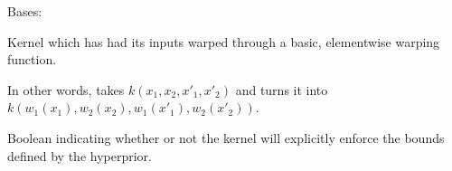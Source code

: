 \documentclass[letterpaper,10pt,english]{sphinxmanual}
\begin{document}
\begin{fulllineitems}
\label{gptools.kernel:gptools.kernel.warping.WarpedKernel}
Bases: {\hyperref[gptools.kernel:gptools.kernel.core.Kernel]{}}

Kernel which has had its inputs warped through a basic, elementwise warping function.

In other words, takes \(k(x_1, x_2, x'_1, x'_2)\) and turns it into
\(k(w_1(x_1), w_2(x_2), w_1(x'_1), w_2(x'_2))\).

\begin{fulllineitems}
\label{gptools.kernel:gptools.kernel.warping.WarpedKernel.__call__}
\end{fulllineitems}


\begin{fulllineitems}
\label{gptools.kernel:gptools.kernel.warping.WarpedKernel.enforce_bounds}
Boolean indicating whether or not the kernel will explicitly enforce the bounds defined by the hyperprior.

\end{fulllineitems}


\begin{fulllineitems}
\label{gptools.kernel:gptools.kernel.warping.WarpedKernel.fixed_params}
\end{fulllineitems}


\begin{fulllineitems}
\label{gptools.kernel:gptools.kernel.warping.WarpedKernel.params}
\end{fulllineitems}


\begin{fulllineitems}
\label{gptools.kernel:gptools.kernel.warping.WarpedKernel.param_names}
\end{fulllineitems}


\end{fulllineitems}
\end{document}
